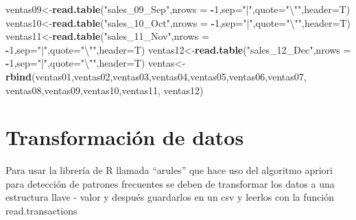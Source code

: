 \documentclass[]{article}
\newenvironment{Shaded}{\begin{snugshade}}{\end{snugshade}}
\newcommand{\KeywordTok}[1]{\textcolor[rgb]{0.13,0.29,0.53}{\textbf{#1}}}
\newcommand{\DataTypeTok}[1]{\textcolor[rgb]{0.13,0.29,0.53}{#1}}
\newcommand{\DecValTok}[1]{\textcolor[rgb]{0.00,0.00,0.81}{#1}}
\newcommand{\CharTok}[1]{\textcolor[rgb]{0.31,0.60,0.02}{#1}}
\newcommand{\StringTok}[1]{\textcolor[rgb]{0.31,0.60,0.02}{#1}}
\newcommand{\OperatorTok}[1]{\textcolor[rgb]{0.81,0.36,0.00}{\textbf{#1}}}
\newcommand{\NormalTok}[1]{#1}
\begin{document}
\begin{Shaded}
\begin{Highlighting}[]
\NormalTok{ventas09<-}\KeywordTok{read.table}\NormalTok{(}\StringTok{"sales_09_Sep"}\NormalTok{,}\DataTypeTok{nrows =} \OperatorTok{-}\DecValTok{1}\NormalTok{,}\DataTypeTok{sep=}\StringTok{"|"}\NormalTok{,}\DataTypeTok{quote=}\StringTok{"}\CharTok{\textbackslash{}"}\StringTok{"}\NormalTok{,}\DataTypeTok{header=}\NormalTok{T)}
\NormalTok{ventas10<-}\KeywordTok{read.table}\NormalTok{(}\StringTok{"sales_10_Oct"}\NormalTok{,}\DataTypeTok{nrows =} \OperatorTok{-}\DecValTok{1}\NormalTok{,}\DataTypeTok{sep=}\StringTok{"|"}\NormalTok{,}\DataTypeTok{quote=}\StringTok{"}\CharTok{\textbackslash{}"}\StringTok{"}\NormalTok{,}\DataTypeTok{header=}\NormalTok{T)}
\NormalTok{ventas11<-}\KeywordTok{read.table}\NormalTok{(}\StringTok{"sales_11_Nov"}\NormalTok{,}\DataTypeTok{nrows =} \OperatorTok{-}\DecValTok{1}\NormalTok{,}\DataTypeTok{sep=}\StringTok{"|"}\NormalTok{,}\DataTypeTok{quote=}\StringTok{"}\CharTok{\textbackslash{}"}\StringTok{"}\NormalTok{,}\DataTypeTok{header=}\NormalTok{T)}
\NormalTok{ventas12<-}\KeywordTok{read.table}\NormalTok{(}\StringTok{"sales_12_Dec"}\NormalTok{,}\DataTypeTok{nrows =} \OperatorTok{-}\DecValTok{1}\NormalTok{,}\DataTypeTok{sep=}\StringTok{"|"}\NormalTok{,}\DataTypeTok{quote=}\StringTok{"}\CharTok{\textbackslash{}"}\StringTok{"}\NormalTok{,}\DataTypeTok{header=}\NormalTok{T)}
\NormalTok{ventas<-}\KeywordTok{rbind}\NormalTok{(ventas01,ventas02,ventas03,ventas04,ventas05,ventas06,ventas07,}
\NormalTok{              ventas08,ventas09,ventas10,ventas11,}
\NormalTok{              ventas12)}
\end{Highlighting}
\end{Shaded}

\section{Transformación de datos}\label{transformacion-de-datos}

Para usar la librería de R llamada ``arules'' que hace uso del algoritmo
apriori para detección de patrones frecuentes se deben de transformar
los datos a una estructura llave - valor y después guardarlos en un csv
y leerlos con la función read.transactions
\end{document}
